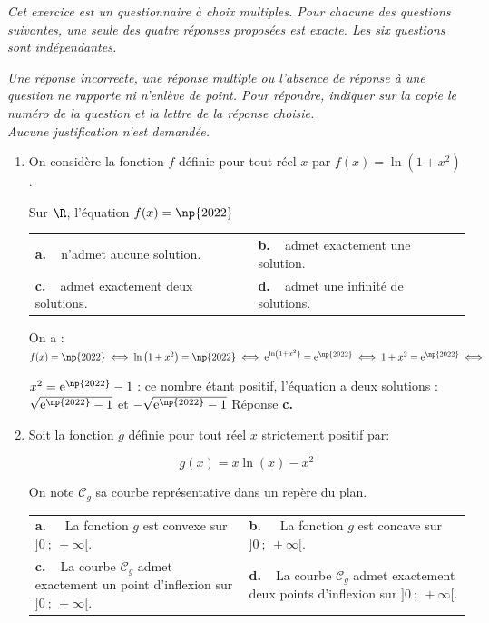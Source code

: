 \medskip

\emph{Cet exercice est un questionnaire à choix multiples. Pour chacune des questions suivantes, une seule des quatre réponses proposées est exacte. Les six questions sont indépendantes.}

\smallskip

\emph{Une réponse incorrecte, une réponse multiple ou l'absence de réponse à une question ne rapporte ni n'enlève de point. Pour répondre, indiquer sur la copie le numéro de la question et la lettre de la réponse choisie.\\
Aucune justification n'est demandée.}

\medskip

\begin{enumerate}
\item On considère la fonction $f$ définie pour tout réel $x$ par $f(x) = \ln \left(1 + x^2\right)$.

Sur $\R$, l'équation $f(x) = \np{2022}$

\begin{center}
\begin{tabularx}{\linewidth}{*{2}{X}}
\textbf{a.~~}n'admet aucune solution. &\textbf{b.~~}admet exactement une solution.\\
\textbf{c.~~}admet exactement deux solutions.&\textbf{d.~~}admet une infinité de solutions.
\end{tabularx}
\end{center}
On a : $f(x) = \np{2022} \iff \ln \left(1 + x^2\right) = \np{2022} \iff \text{e}^{\ln \left(1 + x^2\right)} = \text{e}^{\np{2022}} \iff 1 + x^2 = \text{e}^{\np{2022}} \iff$

$ x^2 = \text{e}^{\np{2022}} - 1$ : ce nombre étant positif, l'équation a deux solutions : $\sqrt{\text{e}^{\np{2022}} - 1}$ et $- \sqrt{\text{e}^{\np{2022}} - 1}$  Réponse \textbf{c.}

\item Soit la fonction $g$ définie pour tout réel $x$ strictement positif par:

\[g(x) = x \ln (x) - x^2\]

On note $\mathcal{C}_g$ sa courbe représentative dans un repère du plan.

\begin{center}
\begin{tabularx}{\linewidth}{*{2}{X}}
\textbf{a.~~} La fonction $g$ est convexe sur $]0~;~+\infty[$.&\textbf{b.~~} La fonction $g$ est concave sur $]0~;~+\infty[$.\\
\textbf{c.~~}La courbe $\mathcal{C}_g$ admet exactement un point d'inflexion sur $]0~;~+\infty[$.&\textbf{d.~~}La courbe $\mathcal{C}_g$ admet exactement
deux points d'inflexion sur $]0~;~+\infty[$.
\end{tabularx}
\end{center}


\end{enumerate}
